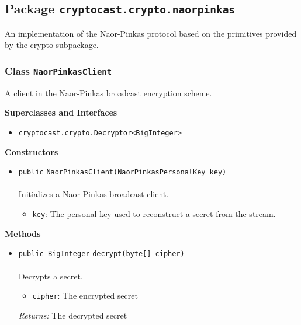 \subsection{Package \lstinline!cryptocast.crypto.naorpinkas!}
An implementation of the Naor-Pinkas protocol based on the primitives provided by the crypto
 subpackage.

\subsubsection{Class \lstinline|NaorPinkasClient|}
A client in the Naor-Pinkas broadcast encryption scheme. \\
\noindent\begin{minipage}[t]{5cm}
\vspace{0.3em}
\hspace*{2em}
\vspace{0.3em}
\end{minipage}



\textbf{\sffamily Superclasses and Interfaces}
\begin{itemize}
\item \lstinline|cryptocast.crypto.Decryptor<BigInteger>|
\end{itemize}


\textbf{\sffamily Constructors}
\begin{itemize}
\item \lstinline|public| \lstinline|NaorPinkasClient|\lstinline|(NaorPinkasPersonalKey key)|\\ \\[-0.6em]
Initializes a Naor-Pinkas broadcast client.
\begin{itemize}
\item \lstinline|key|: The personal key used to reconstruct a secret from the stream.
\end{itemize}



\end{itemize}


\textbf{\sffamily Methods}
\begin{itemize}
\item \lstinline|public BigInteger| \lstinline|decrypt|\lstinline|(byte[] cipher)|\\ \\[-0.6em]
Decrypts a secret.
\begin{itemize}
\item \lstinline|cipher|: The encrypted secret
\end{itemize}

\emph{Returns:} The decrypted secret

\end{itemize}

